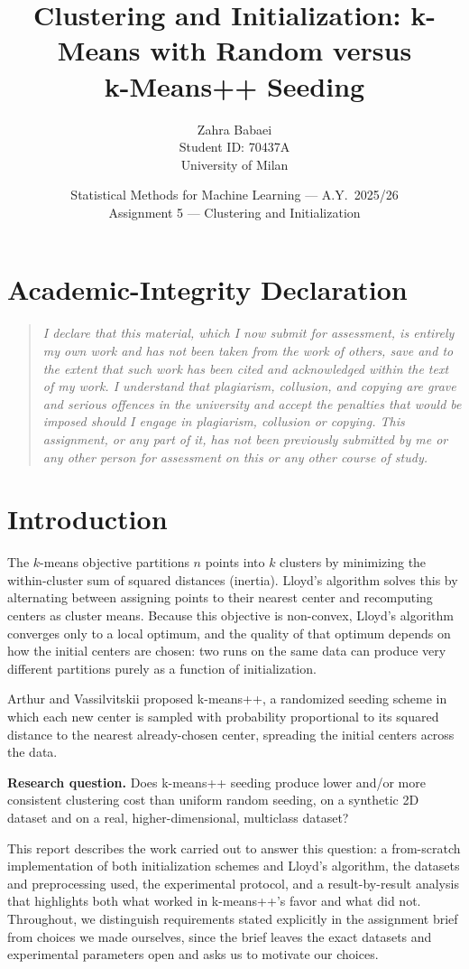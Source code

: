\documentclass[a4paper,11pt]{article}
\title{Clustering and Initialization: k-Means with Random versus\\ k-Means++ Seeding}
\author{Zahra Babaei \\ Student ID: 70437A \\ University of Milan}
\date{Statistical Methods for Machine Learning --- A.Y.\ 2025/26 \\ Assignment 5 --- Clustering and Initialization}
\begin{document}
\maketitle

\section*{Academic-Integrity Declaration}

\begin{quote}
\itshape
I declare that this material, which I now submit for assessment, is entirely my own work and
has not been taken from the work of others, save and to the extent that such work has been
cited and acknowledged within the text of my work. I understand that plagiarism, collusion,
and copying are grave and serious offences in the university and accept the penalties that
would be imposed should I engage in plagiarism, collusion or copying. This assignment, or
any part of it, has not been previously submitted by me or any other person for assessment
on this or any other course of study.
\end{quote}

\section{Introduction}
\label{sec:intro}

The $k$-means objective partitions $n$ points into $k$ clusters by minimizing the
within-cluster sum of squared distances (inertia). Lloyd's algorithm solves this by
alternating between assigning points to their nearest center and recomputing centers as
cluster means. Because this objective is non-convex, Lloyd's algorithm converges only to a
local optimum, and the quality of that optimum depends on how the initial centers are
chosen: two runs on the same data can produce very different partitions purely as a function
of initialization.

Arthur and Vassilvitskii \cite{arthur2007kmeanspp} proposed k-means++, a randomized seeding
scheme in which each new center is sampled with probability proportional to its squared
distance to the nearest already-chosen center, spreading the initial centers across the data.

\textbf{Research question.} Does k-means++ seeding produce lower and/or more consistent
clustering cost than uniform random seeding, on a synthetic 2D dataset and on a real,
higher-dimensional, multiclass dataset?

This report describes the work carried out to answer this question: a from-scratch
implementation of both initialization schemes and Lloyd's algorithm, the datasets and
preprocessing used, the experimental protocol, and a result-by-result analysis that
highlights both what worked in k-means++'s favor and what did not. Throughout, we
distinguish requirements stated explicitly in the assignment brief \cite{smml_assignment5}
from choices we made ourselves, since the brief leaves the exact datasets and experimental
parameters open and asks us to motivate our choices.
\end{document}
